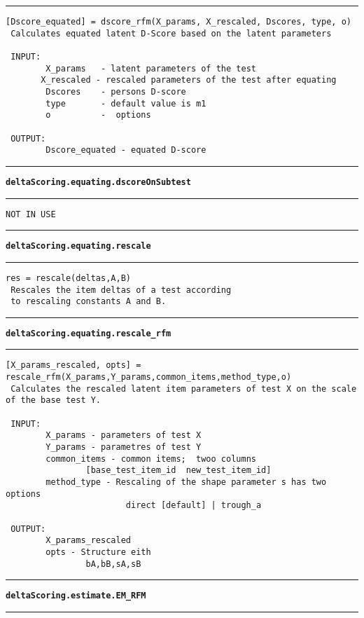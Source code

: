 \par\noindent\rule{\textwidth}{0.4pt}
\begin{lstlisting}[style=Matlab-bw]
 [Dscore_equated] = dscore_rfm(X_params, X_rescaled, Dscores, type, o)
 Calculates equated latent D-Score based on the latent parameters

 INPUT:
		X_params   - latent parameters of the test
       X_rescaled - rescaled parameters of the test after equating
		Dscores    - persons D-score
		type       - default value is m1
		o	       -  options

 OUTPUT:
		Dscore_equated - equated D-score
\end{lstlisting}
\par\noindent\rule{\textwidth}{0.4pt}
{\bf\tt deltaScoring.equating.dscoreOnSubtest}
\par\noindent\rule{\textwidth}{0.4pt}
\begin{lstlisting}[style=Matlab-bw]
 NOT IN USE
\end{lstlisting}
\par\noindent\rule{\textwidth}{0.4pt}
{\bf\tt deltaScoring.equating.rescale}
\par\noindent\rule{\textwidth}{0.4pt}
\begin{lstlisting}[style=Matlab-bw]
 res = rescale(deltas,A,B)
 Rescales the item deltas of a test according
 to rescaling constants A and B.
\end{lstlisting}
\par\noindent\rule{\textwidth}{0.4pt}
{\bf\tt deltaScoring.equating.rescale\_rfm}
\par\noindent\rule{\textwidth}{0.4pt}
\begin{lstlisting}[style=Matlab-bw]
 [X_params_rescaled, opts] = rescale_rfm(X_params,Y_params,common_items,method_type,o)
 Calculates the rescaled latent item parameters of test X on the scale of the base test Y.

 INPUT: 
		X_params - parameters of test X
		Y_params - parametres of test Y
		common_items - common items;  twoo columns 
				[base_test_item_id  new_test_item_id]
		method_type - Rescaling of the shape parameter s has two options
						direct [default] | trough_a 

 OUTPUT: 
		X_params_rescaled
		opts - Structure eith
				bA,bB,sA,sB
\end{lstlisting}
\par\noindent\rule{\textwidth}{0.4pt}
{\bf\tt deltaScoring.estimate.EM\_RFM}
\par\noindent\rule{\textwidth}{0.4pt}

